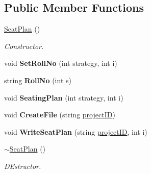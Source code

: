 \subsection*{Public Member Functions}
\begin{DoxyCompactItemize}
\item 
\hyperlink{classSeatPlan_ab1906186f96847704ed71f1a6c738327}{Seat\-Plan} ()
\begin{DoxyCompactList}\small\item\em Constructor. \end{DoxyCompactList}\item 
\hypertarget{classSeatPlan_afa418b9edadff831c73ea6005666becf}{void {\bfseries Set\-Roll\-No} (int strategy, int i)}\label{classSeatPlan_afa418b9edadff831c73ea6005666becf}

\item 
\hypertarget{classSeatPlan_a3dfc44c97eab7f3d33f2023ae0faaa13}{string {\bfseries Roll\-No} (int s)}\label{classSeatPlan_a3dfc44c97eab7f3d33f2023ae0faaa13}

\item 
\hypertarget{classSeatPlan_a1df3b03c983936c07225ed1a79959f1b}{void {\bfseries Seating\-Plan} (int strategy, int i)}\label{classSeatPlan_a1df3b03c983936c07225ed1a79959f1b}

\item 
\hypertarget{classSeatPlan_ade684c0f63b648d4d62df8e7ed800682}{void {\bfseries Create\-File} (string \hyperlink{classReadInput_a3ad470a25b3e0a29466bf4ff1f7d8e81}{project\-I\-D})}\label{classSeatPlan_ade684c0f63b648d4d62df8e7ed800682}

\item 
\hypertarget{classSeatPlan_a3f29cad9d9be46f7bc3055de2ab887fc}{void {\bfseries Write\-Seat\-Plan} (string \hyperlink{classReadInput_a3ad470a25b3e0a29466bf4ff1f7d8e81}{project\-I\-D}, int i)}\label{classSeatPlan_a3f29cad9d9be46f7bc3055de2ab887fc}

\item 
\hyperlink{classSeatPlan_a373a1d60b6617a2e424f7d2f8866ec2e}{$\sim$\-Seat\-Plan} ()
\begin{DoxyCompactList}\small\item\em D\-Estructor. \end{DoxyCompactList}\end{DoxyCompactItemize}
